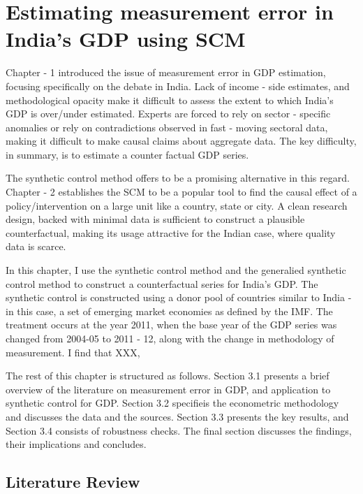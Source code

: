 \documentclass[12pt,nobind, a4paper]{reedthesis}
\begin{document}
 \hypertarget{estimating-measurement-error-in-indias-gdp-using-scm}{%
 \chapter{Estimating measurement error in India's GDP using SCM}\label{estimating-measurement-error-in-indias-gdp-using-scm}}

 Chapter - 1 introduced the issue of measurement error in GDP estimation, focusing specifically on the debate in India. Lack of income - side estimates, and methodological opacity make it difficult to assess the extent to which India's GDP is over/under estimated. Experts are forced to rely on sector - specific anomalies or rely on contradictions observed in fast - moving sectoral data, making it difficult to make causal claims about aggregate data. The key difficulty, in summary, is to estimate a counter factual GDP series.
 \linebreak

 The synthetic control method offers to be a promising alternative in this regard. Chapter - 2 establishes the SCM to be a popular tool to find the causal effect of a policy/intervention on a large unit like a country, state or city. A clean research design, backed with minimal data is sufficient to construct a plausible counterfactual, making its usage attractive for the Indian case, where quality data is scarce.
 \linebreak

 In this chapter, I use the synthetic control method and the generalied synthetic control method to construct a counterfactual series for India's GDP. The synthetic control is constructed using a donor pool of countries similar to India - in this case, a set of emerging market economies as defined by the IMF. The treatment occurs at the year 2011, when the base year of the GDP series was changed from 2004-05 to 2011 - 12, along with the change in methodology of measurement. I find that XXX,
 \linebreak

 The rest of this chapter is structured as follows. Section 3.1 presents a brief overview of the literature on measurement error in GDP, and application to synthetic control for GDP. Section 3.2 specifieis the econometric methodology and discusses the data and the sources. Section 3.3 presents the key results, and Section 3.4 consists of robustness checks. The final section discusses the findings, their implications and concludes.

 \hypertarget{literature-review}{%
 \section{Literature Review}\label{literature-review}}
\end{document}

